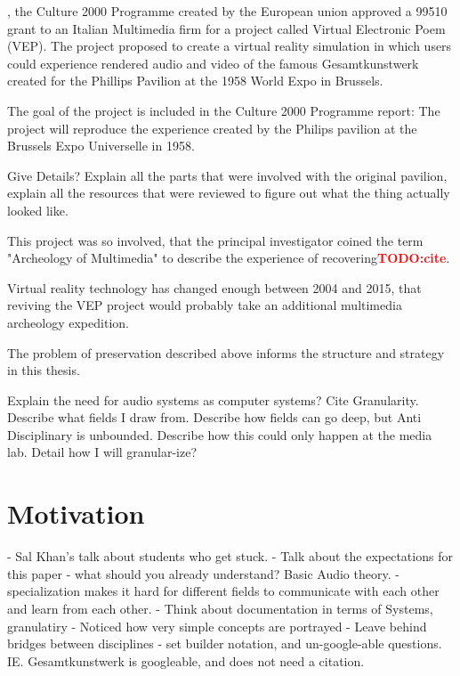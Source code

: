 \documentclass{tufte-book}
\newcommand{\TODO}[1]{\textcolor{red}{\bf TODO:#1}\xspace}
\begin{document}
, the Culture 2000 Programme created by the 
European union approved a 99510\EUR{} grant to an Italian Multimedia 
firm for a project called Virtual Electronic Poem (VEP)\cite{eu2004}. 
The project proposed to create a virtual reality simulation in which 
users could experience rendered audio and video of the famous
Gesamtkunstwerk created for the Phillips Pavilion at the 1958 World
Expo in Brussels. 

The goal of the project is included in the Culture 2000 Programme
report: The project will reproduce the experience created by the
Philips pavilion at the Brussels Expo Universelle in 1958.

Give Details? Explain all the parts that were involved with the
original pavilion, explain all the resources that were reviewed to
figure out what the thing actually looked like.

This project was so involved, that the principal investigator coined
the term "Archeology of Multimedia" to describe the experience of
recovering\TODO{cite}.

Virtual reality technology has changed enough between 2004 and 2015,
that reviving the VEP project would probably take an additional
multimedia archeology expedition.

The problem of preservation described above informs the structure and
strategy in this thesis. 

Explain the need for audio systems as computer systems? Cite
Granularity. Describe what fields I draw from. Describe how fields can
go deep, but Anti Disciplinary is unbounded. Describe how this could
only happen at the media lab. Detail how I will granular-ize?

\section{Motivation}
\label{sec:motivation}

  - Sal Khan's talk about students who get stuck. 
  - Talk about the expectations for this paper - what should you
    already understand? Basic Audio theory. 
  - specialization makes it hard for different fields to communicate
  with each other and learn from each other.
  - Think about documentation in terms of Systems, granulatiry
  - Noticed how very simple concepts are portrayed 
  - Leave behind bridges between disciplines
  - set builder notation, and un-google-able
  questions. IE. Gesamtkunstwerk is googleable, and does not need a
  citation. 

\backmatter





\end{document}
